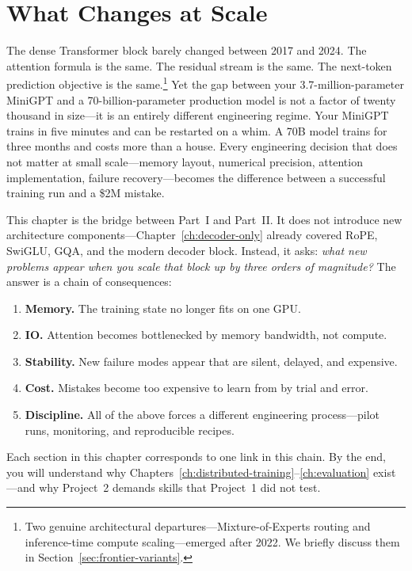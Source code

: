 \chapter{What Changes at Scale}
\label{ch:what-changes}

The dense Transformer block barely changed between 2017 and 2024. The attention formula is the same. The residual stream is the same. The next-token prediction objective is the same.\footnote{Two genuine architectural departures---Mixture-of-Experts routing and inference-time compute scaling---emerged after 2022. We briefly discuss them in Section~\ref{sec:frontier-variants}.} Yet the gap between your 3.7-million-parameter MiniGPT and a 70-billion-parameter production model is not a factor of twenty thousand in size---it is an entirely different engineering regime. Your MiniGPT trains in five minutes and can be restarted on a whim. A 70B model trains for three months and costs more than a house. Every engineering decision that does not matter at small scale---memory layout, numerical precision, attention implementation, failure recovery---becomes the difference between a successful training run and a \$2M mistake.

This chapter is the bridge between Part~I and Part~II. It does not introduce new architecture components---Chapter~\ref{ch:decoder-only} already covered RoPE, SwiGLU, GQA, and the modern decoder block. Instead, it asks: \emph{what new problems appear when you scale that block up by three orders of magnitude?} The answer is a chain of consequences:

\begin{enumerate}[nosep]
  \item \textbf{Memory.} The training state no longer fits on one GPU.
  \item \textbf{IO.} Attention becomes bottlenecked by memory bandwidth, not compute.
  \item \textbf{Stability.} New failure modes appear that are silent, delayed, and expensive.
  \item \textbf{Cost.} Mistakes become too expensive to learn from by trial and error.
  \item \textbf{Discipline.} All of the above forces a different engineering process---pilot runs, monitoring, and reproducible recipes.
\end{enumerate}

Each section in this chapter corresponds to one link in this chain. By the end, you will understand why Chapters~\ref{ch:distributed-training}--\ref{ch:evaluation} exist---and why Project~2 demands skills that Project~1 did not test.

